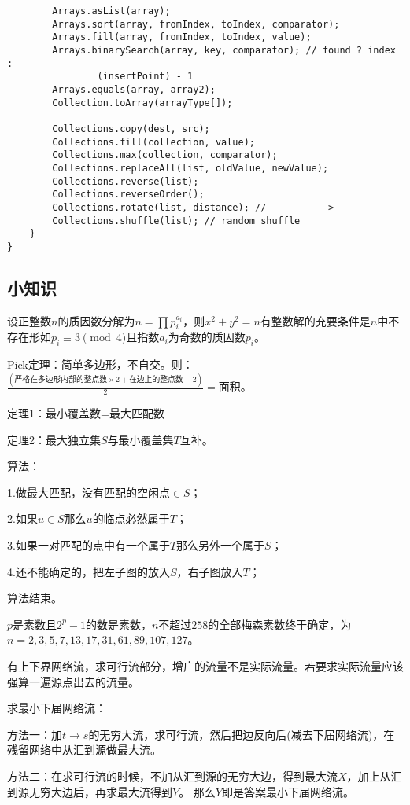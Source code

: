 \documentclass{article}
\begin{document}
\begin{lstlisting}
        Arrays.asList(array);
        Arrays.sort(array, fromIndex, toIndex, comparator);
        Arrays.fill(array, fromIndex, toIndex, value);
        Arrays.binarySearch(array, key, comparator); // found ? index : -
                (insertPoint) - 1
        Arrays.equals(array, array2);
        Collection.toArray(arrayType[]);

        Collections.copy(dest, src);
        Collections.fill(collection, value);
        Collections.max(collection, comparator);
        Collections.replaceAll(list, oldValue, newValue);
        Collections.reverse(list);
        Collections.reverseOrder();
        Collections.rotate(list, distance); //  --------->
        Collections.shuffle(list); // random_shuffle
    }
}
\end{lstlisting}

\subsection{小知识}

设正整数$n$的质因数分解为$n=\prod p_i^{a_i}$，则$x^2+y^2=n$有整数解的充要条件是$n$中不存在形如$p_i \equiv 3\pmod{4}$且指数$a_i$为奇数的质因数$p_i$。

Pick定理：简单多边形，不自交。则：$\frac{(\mbox{严格在多边形内部的整点数}\times 2+\mbox{在边上的整点数}-2)}{2}=\mbox{面积}$。

定理1：最小覆盖数=最大匹配数

定理2：最大独立集$S$与最小覆盖集$T$互补。

算法：

1.做最大匹配，没有匹配的空闲点$\in S$；

2.如果$u\in S$那么$u$的临点必然属于$T$；

3.如果一对匹配的点中有一个属于$T$那么另外一个属于$S$；

4.还不能确定的，把左子图的放入$S$，右子图放入$T$；

算法结束。

$p$是素数且$2^p-1$的数是素数，$n$不超过$258$的全部梅森素数终于确定，为
$n=2,3,5,7,13,17,31,61,89,107,127$。

有上下界网络流，求可行流部分，增广的流量不是实际流量。若要求实际流量应该强算一遍源点出去的流量。

求最小下届网络流：

方法一：加$t\to s$的无穷大流，求可行流，然后把边反向后(减去下届网络流)，在残留网络中从汇到源做最大流。

方法二：在求可行流的时候，不加从汇到源的无穷大边，得到最大流$X$，加上从汇到源无穷大边后，再求最大流得到$Y$。
那么$Y$即是答案最小下届网络流。
\end{document}
